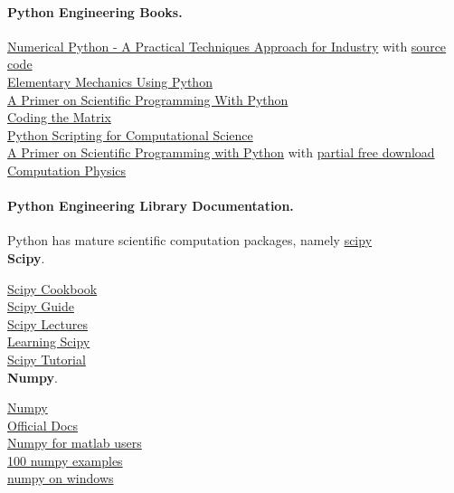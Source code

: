 \documentclass[%
oneside,                 %
final,                   %
10pt]{article}
\begin{document}
\paragraph{Python Engineering Books.}
\href{{http://www.apress.com/9781484205549}}{Numerical Python - A Practical Techniques Approach for Industry} with \href{{http://www.apress.com/downloadable/download/sample/sample_id/1732/}}{source code}  \\
\href{{http://www.springer.com/us/book/9783319195957#aboutBook}}{Elementary Mechanics Using Python}   \\
\href{{http://hplgit.github.io/primer.html/doc/web/index.html}}{A Primer on Scientific Programming With Python}  \\
\href{{http://codingthematrix.com/}}{Coding the Matrix} \\
\href{{http://www.springer.com/us/book/9783540739159}}{Python Scripting for Computational Science} \\
\href{{http://www.springer.com/us/book/9783662498866}}{A Primer on Scientific Programming with Python}  with \href{{https://hplgit.github.io/primer.html/doc/pub/half/book.pdf}}{partial free download} \\
\href{{http://www-personal.umich.edu/~mejn/computational-physics/}}{Computation Physics} \\

\paragraph{Python Engineering Library Documentation.}
Python has mature scientific computation packages, namely \href{{https://www.scipy.org/}}{scipy} \\

\textbf{Scipy}.

\href{{http://scipy-cookbook.readthedocs.io/index.html}}{Scipy Cookbook}  \\
\href{{http://www.davekuhlman.org/scipy_guide_01.html}}{Scipy Guide}  \\
\href{{http://www.scipy-lectures.org/index.html}}{Scipy Lectures}   \\
\href{{https://github.com/rojassergio/Learning-Scipy}}{Learning Scipy}   \\
\href{{http://docs.scipy.org/doc/scipy/reference/tutorial/}}{Scipy Tutorial}   \\

\textbf{Numpy}.

\href{{https://wiki.python.org/moin/NumericAndScientific}}{Numpy}  \\
\href{{https://docs.scipy.org/doc/numpy-dev/contents.html}}{Official Docs}  \\
\href{{https://docs.scipy.org/doc/numpy-dev/user/numpy-for-matlab-users.html}}{Numpy for matlab users}  \\
\href{{https://github.com/rougier/numpy-100}}{100 numpy examples}  \\
\href{{https://github.com/numpy/numpy/wiki/Numerical-software-on-Windows}}{numpy on windows}  \\
\end{document}
